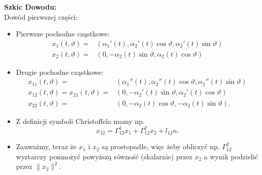 \begin{frame}[allowdisplaybreaks=4,squeeze]
\textcolor{ared}{\textbf{Szkic Dowodu: }}\\\pause 
Dowód pierwszej części:
\begin{itemize}
\item Pierwsze pochodne cząstkowe: \vspace*{-0.05in}
\begin{align*}
x_1(t,\vartheta)=&(\alpha_1'(t),\alpha_2'(t)\cos\vartheta,\alpha_2'(t)\sin\vartheta)\\
x_2(t,\vartheta)=&(0,-\alpha_2(t)\sin\vartheta,\alpha_2(t)\cos\vartheta)
\end{align*}\vspace*{-0.2in}
\pause \item Drugie pochodne cząstkowe:\vspace*{-0.05in}
\begin{align*}
x_{11}(t,\vartheta)=&(\alpha_1''(t),\alpha_2''(t)\cos\vartheta,\alpha_2''(t)\sin\vartheta)\\
x_{12}(t,\vartheta)=x_{21}(t,\vartheta)=&(0,-\alpha_2'(t)\sin\vartheta,\alpha_2'(t)\cos\vartheta)\\
x_{22}(t,\vartheta)=&(0,-\alpha_2(t)\cos\vartheta,-\alpha_2(t)\sin\vartheta).
\end{align*}\vspace*{-0.2in}
\pause \item Z definicji symboli Christoffela mamy np.
\[x_{12}=\Gamma_{12}^1x_1+\Gamma_{12}^2x_2+l_{12}n.\]

\pause\item Zauważmy, teraz że $x_1$ i $x_2$ są prostopadłe, więc żeby obliczyć np. $\Gamma_{12}^2$ wystarczy pomnożyć powyższą równość (skalarnie) przez $x_2$ a wynik podzielić przez $\|x_2\|^2$.
\end{itemize}
\end{frame}

